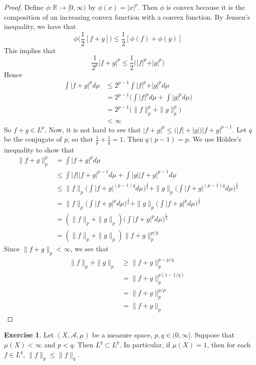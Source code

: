 \documentclass[12pt]{amsart}
\theoremstyle{definition}
\newtheorem{ex}[definition]{Exercise}
\newcommand{\R}{\mathbb{R}}
\newcommand{\MA}{\mathcal{A}}
\newcommand{\Rg}{[0,\infty)}
\newcommand{\lex}[1]{\label{ex:#1}}
\begin{document}
	\begin{proof}
		Define $\phi:\R \rightarrow \Rg$ by $\phi(x) = \vert x \vert^p$. Then $\phi$ is convex because it is the composition of an increasing convex function with a convex function. By Jensen's inequality, we have that $$\phi\bigg(\frac{1}{2}[f+g] \bigg) \leq \frac{1}{2}[\phi(f)+\phi(g)]$$ 
		This implies that $$\frac{1}{2^p} \vert f+g\vert^p \leq \frac{1}{2}\bigg(\vert f\vert^p +\vert g \vert^p\bigg)$$ 
		Hence 
		\begin{align*}
			\int\vert f + g\vert^p d \mu 
			& \leq 2^{p-1}\int \vert f\vert^p +\vert g\vert^p d\mu \\
			& = 2^{p-1}\bigg(\int \vert f\vert^p d\mu + \int \vert g\vert^p d\mu \bigg) \\
			&= 2^{p-1}\bigg( \|f \|_p^p + \|g \|_p^p\bigg) \\
			& < \infty
		\end{align*}
		So $f+g \in L^p$. Now, it is not hard to see that $|f+g|^p \leq \big( |f| + |g| \big)|f+g|^{p-1}$. Let $q$ be the conjugate of $p$, so that $\frac{1}{p} + \frac{1}{q} = 1$. Then $q(p-1) = p$. We use Hölder's inequality to show that 
		\begin{align*}
			\|f+g \|_p ^p
			&= \int  |f+g|^p d \mu \\
			& \leq \int |f| |f+g|^{p-1} d \mu + \int |g| |f+g|^{p-1} d \mu \\
			& \leq \|f\|_p \bigg(\int |f+g|^{(p-1)q} d\mu\bigg)^{\frac{1}{q}} + \|g\|_p \bigg(\int |f+g|^{(p-1)q}d\mu\bigg)^{\frac{1}{q}} \\
			&= \|f\|_p \bigg(\int |f+g|^{p} d\mu\bigg)^{\frac{1}{q}} + \|g\|_p \bigg(\int |f+g|^{p}d\mu\bigg)^{\frac{1}{q}} \\ 
			&= (\|f\|_p + \|g \|_p) \bigg(\int |f+g|^{p} d\mu\bigg)^{\frac{1}{q}}\\
			&= (\|f \|_p + \|g \|_p) \|f+g \|_p^{p/q}
		\end{align*}
		Since $\|f+g \|_p < \infty$, we see that
		\begin{align*}
			\|f \|_p + \|g \|_p 
			& \geq \|f+g \|_p ^{p - p/q} \\
			&=  \|f+g \|_p ^{p(1 - 1/q)} \\
			&= \|f+g \|_p ^{p/p} \\
			&= \|f+g \|_p
		\end{align*}
	\end{proof}
	
	\begin{ex} \lex{00000} 
		Let $(X, \MA, \mu)$ be a measure space, $p,q \in (0, \infty]$. Suppose that $\mu(X) < \infty$ and $p < q$. Then $L^q \subset L^p$. In particular, if $\mu(X) = 1$, then for each $f \in L^q$, $\|f\|_p \leq \|f\|_q$.
	\end{ex}
	
\end{document}
